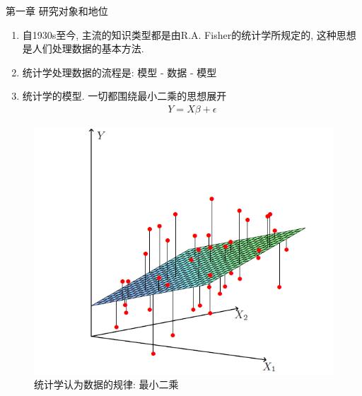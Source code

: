 \documentclass[compress,10pt,dvipsnames,notheorems]{beamer} %
\begin{document}

\begin{frame}{第一章 研究对象和地位}
\begin{solu}
\begin{enumerate}
\item 自1930s至今, 主流的知识类型都是由R.A. Fisher的统计学所规定的, 这种思想是人们处理数据的基本方法.
\item 统计学处理数据的流程是:
模型 - 数据 - 模型
\item 统计学的模型{\color{red}{由观测变量直接组成, 只是组合系数未知}}. 一切都围绕最小二乘的思想展开
\begin{align*}
Y = X\beta + \epsilon
\end{align*}
\end{enumerate}
\end{solu}
\begin{figure}
\includegraphics[width=.4\linewidth]{Imgs/least-square.png}
\captionsetup{labelformat=empty}
\caption{统计学认为数据的规律: 最小二乘}
\end{figure}
\end{frame}
\end{document}

